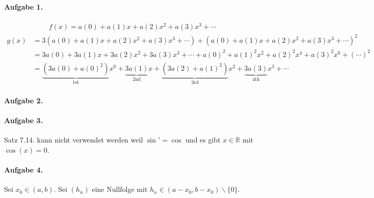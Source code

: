 \documentclass{article}
\begin{document}
\paragraph{Aufgabe 1.}

\begin{align*}
    f(x) = a(0) + a(1)x + a(2)x^2 + a(3)x^3 + \cdots
\end{align*}
\begin{align*}
    g(x) &= 3\left(a(0) + a(1)x + a(2)x^2 + a(3)x^3 + \cdots\right) + \left(a(0) + a(1)x + a(2)x^2 + a(3)x^3 + \cdots\right)^2 \\
    &= 3a(0) + 3a(1)x + 3a(2)x^2 + 3a(3)x^3 + \cdots + a(0)^2 + a(1)^2x^2 + a(2)^2x^4 + a(3)^2x^6 + (\cdots)^2 \\
    &= \underbrace{(3a(0) + a(0)^2)}_{\text{1st}}x^0 + \underbrace{3a(1)}_{\text{2nd}}x + \underbrace{(3a(2) + a(1)^2)}_{\text{3rd}}x^2 + \underbrace{3a(3)}_{\text{4th}}x^3 + \cdots
\end{align*}

\paragraph{Aufgabe 2.}



\paragraph{Aufgabe 3.} Satz 7.14. kann nicht verwendet werden weil $\sin' = \cos$ und es gibt $x \in \mathbb{R}$ mit $\cos(x) = 0$.

\paragraph{Aufgabe 4.}

Sei $x_0 \in (a, b)$. Sei $(h_n)$ eine Nullfolge mit $h_n \in (a - x_0, b - x_0) \backslash \{0\}$.
\end{document}
